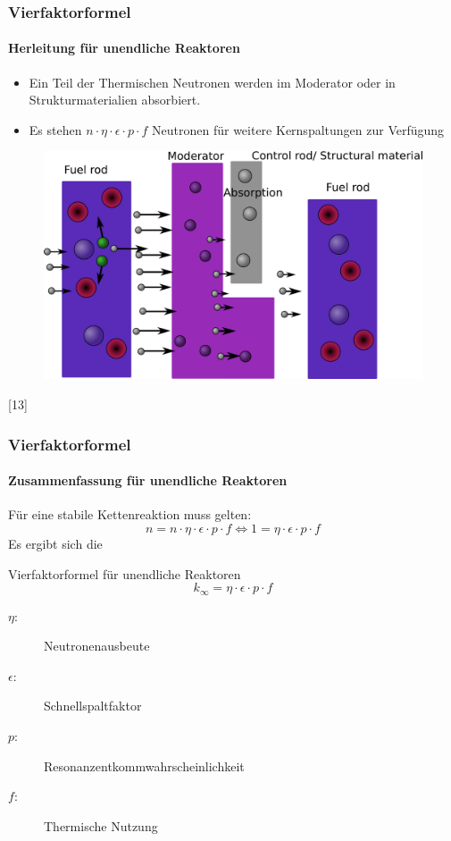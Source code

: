 \documentclass{beamer}[9pt]
\begin{document}
\begin{frame}
\frametitle{Vierfaktorformel}
\framesubtitle{Herleitung für unendliche Reaktoren}
\begin{itemize}
\item Ein Teil der Thermischen Neutronen werden im Moderator oder in Strukturmaterialien absorbiert.
\item Es stehen  $n\cdot\eta\cdot\epsilon\cdot p\cdot f$ Neutronen für weitere Kernspaltungen zur Verfügung 
\end{itemize}

\begin{figure}
\centering
\includegraphics[scale=.15]{thermal_reactor_full.png}
\end{figure}
\hspace{.5\textwidth}[13]
\end{frame}

\begin{frame}
\frametitle{Vierfaktorformel}
\framesubtitle{Zusammenfassung für unendliche Reaktoren}
Für eine stabile Kettenreaktion muss gelten:
\[
n = n\cdot\eta\cdot\epsilon\cdot p\cdot f \Leftrightarrow 1 = \eta\cdot\epsilon\cdot p\cdot f 
\]
Es ergibt sich die
\begin{block}{Vierfaktorformel für unendliche Reaktoren}
\[
k_\infty =  \eta\cdot\epsilon\cdot p\cdot f
\]
\begin{description}
\item[$\eta$:] Neutronenausbeute
\item[$\epsilon$:] Schnellspaltfaktor
\item[$p$:] Resonanzentkommwahrscheinlichkeit
\item[$f$:] Thermische Nutzung
\end{description}

\end{block}
\end{frame}
\end{document}
